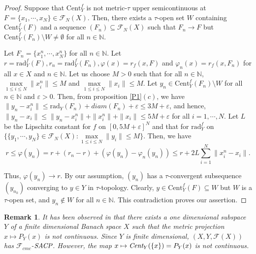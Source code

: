\documentclass[11pt]{amsart}
\newtheorem{rem}[thm]{Remark}
\newcommand{\ra}{\rightarrow}
\newcommand{\es}{\emptyset}
\newcommand{\vp}{\varphi}
\newcommand{\ci}{\subseteq}
\newcommand{\e}{\varepsilon}
\newcommand{\mb}{\mathbb}
\newcommand{\mc}{\mathcal}
\newcommand{\mr}{\mathscr}
\newcommand{\sm}{\setminus}
\newcommand{\trC}{\textrm{Cent}}
\newcommand{\trr}{\textrm{rad}}
\newcommand{\emC}{\emph{Cent}}
\newcommand{\eSACP}{\bf{\emph{SACP}}}
\begin{document}
\begin{proof}
Suppose that $\trC_Y^f$ is not metric-$\tau$ upper semicontinuous at $F=\{x_1,\cdots,x_N\}\in \mc{F}_N(X)$. Then, there exists a $\tau$-open set $W$ containing $\trC_Y^f(F)$ and a sequence $(F_n)\ci \mc{F}_N(X)$ such that $F_n\ra F$ but $\trC_Y^f(F_n)\sm W\neq\es$ for all $n\in\mb{N}$. 

Let $F_n=\{x_1^n,\cdots,x_N^n\}$ for all $n\in\mb{N}$. Let $r=\trr_Y^f(F), r_n=\trr_Y^f(F_n),\vp(x)=r_f(x,F)$ and $\vp_n(x)=r_f(x,F_n)$ for all $x\in X$ and $n\in\mb{N}$. Let us choose $M>0$ such that for all $n\in\mb{N}$, $\underset{1\leq i\leq N}{\max}\|x_i^n\|\leq M$ and $\underset{1\leq i\leq N}{\max}\|x_i\|\leq M$. Let $y_n\in\trC_Y^f(F_n)\sm W$ for all $n\in\mb{N}$ and $\e>0$. Then, from proposition \ref{P1}$(c)$, we have $\|y_n-x_i^n\|\leq \trr_Y(F_n)+diam(F_n)+\e\leq 3M+\e$, and hence, $\|y_n-x_i\|\leq\|y_n-x_i^n\|+\|x_i^n\|+\|x_i\|\leq 5M+\e$ for all $i=1,\cdots,N$. Let $L$ be the Lipschitz constant for $f$ on $[0,5M+\e]^N$ and that for $\trr_Y^f$ on $\{\{y_1,\cdots,y_N\}\in \mc{F}_N(X):\underset{1\leq i\leq N}{\max}\|y_i\|\leq M\}$. Then, we have
\[
r\leq \vp(y_n)=r+(r_n-r)+(\vp(y_n)-\vp_n(y_n))
\leq r+2L\sum_{i=1}^N\|x_i^n-x_i\|.\]

Thus, $\vp(y_n)\ra r$. By our assumption, $(y_n)$ has a $\tau$-convergent subsequence $(y_{n_k})$ converging to $y\in Y$ in $\tau$-topology. Clearly, $y\in\trC_Y^f(F)\ci W$ but $W$ is a $\tau$-open set, and $y_n\notin W$ for all $n\in\mb{N}$. This contradiction proves our assertion.
\end{proof}
\begin{rem}
It has been observed in \cite{DK} that there exists a one dimensional subspace $Y$ of a finite dimensional Banach space $X$ such that the metric projection $x\mapsto P_Y(x)$ is not continuous. Since $Y$ is finite dimensional, $(X,Y,\mc{F}(X))$ has $\mr{F}_{cmc}$-$\eSACP$. However, the map $x\mapsto \emC_Y(\{x\})=P_Y(x)$ is not continuous. 
\end{rem}
\end{document}
